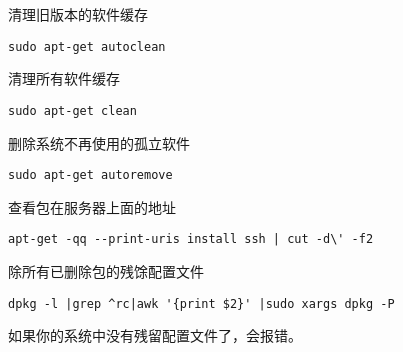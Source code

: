 清理旧版本的软件缓存
\begin{verbatim}
sudo apt-get autoclean
\end{verbatim}

清理所有软件缓存
\begin{verbatim}
sudo apt-get clean
\end{verbatim}

删除系统不再使用的孤立软件
\begin{verbatim}
sudo apt-get autoremove
\end{verbatim}

查看包在服务器上面的地址
\begin{verbatim}
apt-get -qq --print-uris install ssh | cut -d\' -f2
\end{verbatim}

除所有已删除包的残馀配置文件
\begin{verbatim}
dpkg -l |grep ^rc|awk '{print $2}' |sudo xargs dpkg -P 
\end{verbatim}
如果你的系统中没有残留配置文件了，会报错。

